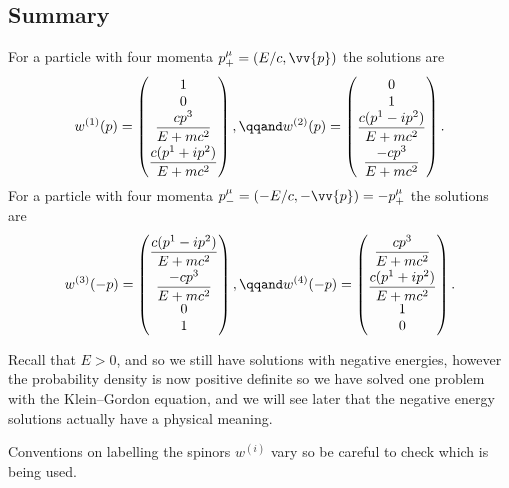 \documentclass[fleqn]{NotesClass}
\begin{document}
    \subsection{Summary}
    For a particle with four momenta \(p^\mu_+ = (E/c, \vv{p})\) the solutions are
    \begin{equation}
        w^{(1)}(p) =
        \begin{pmatrix}
            1\\ 0\\
            \dfrac{cp^3}{E + mc^2}\\[1.5ex]
            \dfrac{c(p^1 + ip^2)}{E + mc^2}
        \end{pmatrix}
        , \qqand w^{(2)}(p) = 
        \begin{pmatrix}
            0\\ 1\\
            \dfrac{c(p^1 - ip^2)}{E + mc^2}\\[1.5ex]
            \dfrac{-cp^3}{E + mc^2}
        \end{pmatrix}
        .
    \end{equation}
    For a particle with four momenta \(p^\mu_- = (-E/c, -\vv{p}) = -p^\mu_+\) the solutions are
    \begin{equation}
        w^{(3)}(-p) =
        \begin{pmatrix}
            \dfrac{c(p^1 - ip^2)}{E + mc^2}\\[1.5ex]
            \dfrac{-cp^3}{E + mc^2}\\
            0\\ 1
        \end{pmatrix}
        , \qqand w^{(4)}(-p) = 
        \begin{pmatrix}
            \dfrac{cp^3}{E + mc^2}\\[1.5ex]
            \dfrac{c(p^1 + ip^2)}{E + mc^2}\\
            1\\ 0
        \end{pmatrix}
        .
    \end{equation}
    
    Recall that \(E > 0\), and so we still have solutions with negative energies, however the probability density is now positive definite so we have solved one problem with the Klein--Gordon equation, and we will see later that the negative energy solutions actually have a physical meaning.
    
    \begin{wrn}
        Conventions on labelling the spinors \(w^{(i)}\) vary so be careful to check which is being used.
    \end{wrn}
    
\end{document}
